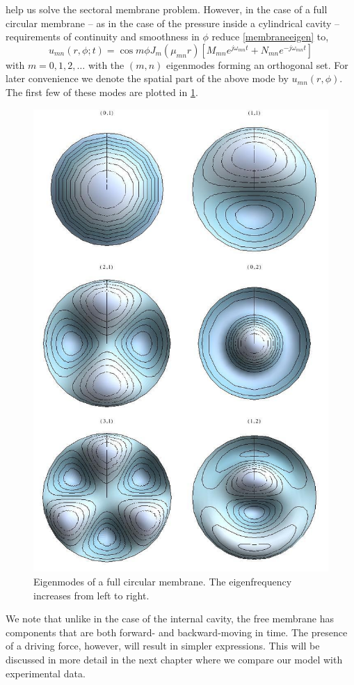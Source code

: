 help us solve the sectoral membrane problem. However, in the case of a full circular membrane -- as in the case
of the pressure inside a cylindrical cavity -- requirements of continuity and smoothness in $\phi$ reduce \eqref{membraneeigen}
to,
\begin{equation}\label{circularmembraneeigen}
 u_{mn}(r,\phi;t)=\cos m\phi J_m(\mu_{mn} r)\left[M_{mn}e^{j\omega_{mn} t}+N_{mn}e^{-j\omega_{mn} t}\right]
\end{equation}
with $m=0,1,2,\ldots$ with the $(m,n)$ eigenmodes forming an orthogonal set. For later convenience we denote the spatial
part of the above mode by $u_{mn}(r,\phi)$. The first few of these modes are plotted in \ref{circularmembraneeigenmodes}.

\begin{figure}[ht!]
 \centering
 \includegraphics[width=.6\linewidth]{Diagrams/CircularMembraneModes/circular_modes_all.png}
 \caption[Circular membrane eigenmodes]{Eigenmodes of a full circular membrane. The eigenfrequency increases from left to right.}
  \label{circularmembraneeigenmodes}
\end{figure}

We note that unlike in the case of the internal cavity, the free membrane has components
that are both forward- and backward-moving in time. The presence of a driving force, however, will result in simpler expressions. This
will be discussed in more detail in the next chapter where we compare our model with experimental data.

